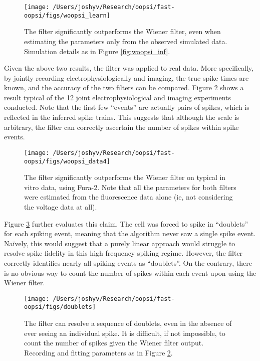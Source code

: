 \begin{figure}[h!]
\centering \texttt{[image: /Users/joshyv/Research/oopsi/fast-oopsi/figs/woopsi\_learn]}
\caption[parameters may be estimated using the \foopsi filter]{The \foopsi filter significantly outperforms the Wiener filter, even when estimating the parameters only from the observed simulated data.  Simulation details as in Figure \ref{fig:woopsi_inf}.} \label{fig:woopsi_learn}
\end{figure}

Given the above two results, the \foopsi filter was applied to real data.  More specifically, by jointly recording electrophysiologically and imaging, the true spike times are known, and the accuracy of the two filters can be compared.  Figure \ref{fig:woopsi_data} shows a result typical of the 12 joint electrophysiological and imaging experiments conducted. Note that the first few ``events'' are actually pairs of spikes, which is reflected in the inferred spike trains. This suggests that although the scale is arbitrary, the \foopsi filter can correctly ascertain the number of spikes within spike events.  

\begin{figure}[h!]
\centering \texttt{[image: /Users/joshyv/Research/oopsi/fast-oopsi/figs/woopsi\_data4]}
\caption[\foopsi filter outperforms Wiener filter on real data]{The \foopsi filter significantly outperforms the Wiener filter on typical in vitro data, using Fura-2.  Note that all the parameters for both filters were estimated from the fluorescence data alone (ie, not considering the voltage data at all).} \label{fig:woopsi_data}
\end{figure}

Figure \ref{fig:woopsi_data_doublets} further evaluates this claim.  The cell was forced to spike in ``doublets'' for each spiking event, meaning that the algorithm never saw a single spike event.  Na\"{i}vely, this would suggest that a purely linear approach would struggle to resolve spike fidelity in this high frequency spiking regime.  However, the \foopsi filter correctly identifies nearly all spiking events as ``doublets''.  On the contrary, there is no obvious way to count the number of spikes within each event upon using the Wiener filter.

\begin{figure}[h!]
\centering \texttt{[image: /Users/joshyv/Research/oopsi/fast-oopsi/figs/doublets]}
\caption[\foopsi filter outperforms Wiener filter on doublets]{The \foopsi filter can resolve a sequence of doublets, even in the absence of ever seeing an individual spike.  It is difficult, if not impossible, to count the number of spikes given the Wiener filter output.  Recording and fitting parameters as in Figure \ref{fig:woopsi_data}.} \label{fig:woopsi_data_doublets}
\end{figure}






